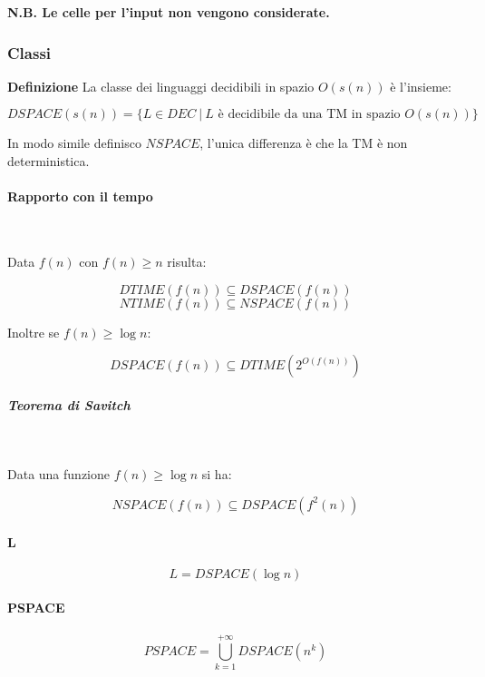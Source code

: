 \documentclass{article}
\begin{document}
\noindent \textbf{N.B. Le celle per l'input non vengono considerate.}\newline

\subsubsection{Classi}

\noindent\textbf{Definizione} La classe dei linguaggi decidibili in spazio $O(s(n))$ è l'insieme:

$$DSPACE(s(n))=\{L\in DEC\ |\ L\text{ è decidibile da una TM in spazio }O(s(n))\}$$\newline

\noindent In modo simile definisco $NSPACE$, l'unica differenza è che la TM è non deterministica.

\paragraph{Rapporto con il tempo} $\ $\newline

\noindent Data $f(n)$ con $f(n)\geq n$ risulta:

$$DTIME(f(n))\subseteq DSPACE(f(n))$$
$$NTIME(f(n))\subseteq NSPACE(f(n))$$\newline

\noindent Inoltre se $f(n)\geq \log n$:

$$DSPACE(f(n))\subseteq DTIME(2^{O(f(n))})$$\newline 

\subparagraph{Teorema di Savitch} $\ $\newline

Data una funzione $f(n)\geq \log n$ si ha:

$$NSPACE(f(n))\subseteq DSPACE(f^2(n))$$\newline

\paragraph{L}

$$L=DSPACE(\log n)$$\newline

\paragraph{PSPACE}

$$PSPACE=\bigcup_{k=1}^{+\infty}DSPACE(n^k)$$\newline
\end{document}
